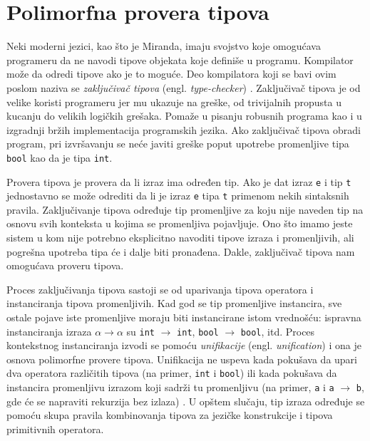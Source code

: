 \section{Polimorfna provera tipova}
\label{sec:provera tipova}

Neki moderni jezici, kao što je Miranda, imaju svojstvo koje omogućava programeru da ne navodi tipove objekata koje definiše u programu. Kompilator može da odredi tipove ako je to moguće. Deo kompilatora koji se bavi ovim poslom naziva se \textit{zaključivač tipova} (engl. \textit{type-checker}) \cite{the-implementation-of-functional-programming-languages}. Zaključivač tipova je od velike koristi programeru jer mu ukazuje na greške, od trivijalnih propusta u kucanju do velikih logičkih grešaka. Pomaže u pisanju robusnih programa kao i u izgradnji bržih implementacija programskih jezika. Ako zaključivač tipova obradi program, pri izvršavanju se neće javiti greške poput upotrebe promenljive tipa \verb|bool| kao da je tipa \verb|int|.


Provera tipova je provera da li izraz ima određen tip. Ako je dat izraz \verb|e| i tip \verb|t| jednostavno se može odrediti da li je izraz \verb|e| tipa \verb|t| primenom nekih sintaksnih pravila. Zaključivanje tipova određuje tip promenljive za koju nije naveden tip na osnovu svih konteksta u kojima se promenljiva pojavljuje. Ono što imamo jeste sistem u kom nije potrebno eksplicitno navoditi tipove izraza i promenljivih, ali pogrešna upotreba tipa će i dalje biti pronađena. Dakle, zaključivač tipova nam omogućava proveru tipova. 


Proces zaključivanja tipova sastoji se od uparivanja tipova operatora i instanciranja tipova promenljivih. Kad god se tip promenljive instancira, sve ostale pojave iste promenljive moraju biti instancirane istom vrednošću: ispravna instanciranja izraza $\alpha \longrightarrow \alpha$ su \verb|int| $\longrightarrow$ \verb|int|,  \verb|bool| $\longrightarrow$ \verb|bool|, itd. Proces kontekstnog instanciranja izvodi se pomoću \textit{unifikacije} (engl. \textit{unification}) i ona je osnova polimorfne provere tipova. Unifikacija ne uspeva kada pokušava da upari dva operatora različitih tipova (na primer, \verb|int| i \verb|bool|) ili kada pokušava da instancira promenljivu izrazom koji sadrži tu promenljivu (na primer, \verb|a| i \verb|a| $\longrightarrow$ \verb|b|, gde će se napraviti rekurzija bez izlaza) \cite{basic-typechecking}. U opštem slučaju, tip izraza određuje se pomoću skupa pravila kombinovanja tipova za jezičke konstrukcije i tipova primitivnih operatora. 

